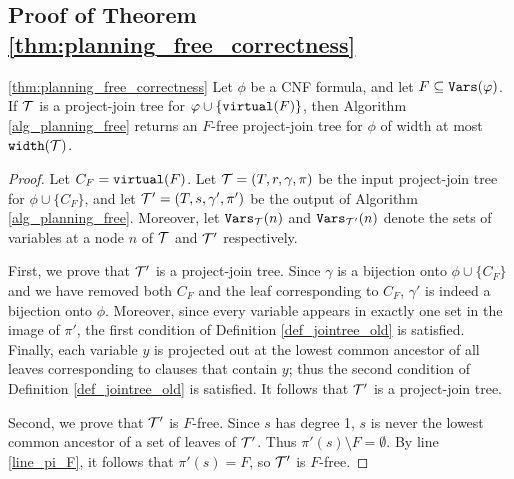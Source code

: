\subsection{Proof of Theorem \ref{thm:planning_free_correctness}}
\begin{theorem}{\ref{thm:planning_free_correctness}}
Let $\phi$ be a CNF formula, and let $F \subseteq \texttt{\upshape Vars}(\varphi)$. 
If $\mathcal{T}$ is a project-join tree for $\varphi \cup \{\texttt{\upshape virtual}(F)\}$, then Algorithm \ref{alg_planning_free} returns an $F$-free project-join tree for $\phi$ of width at most $\texttt{\upshape width}(\mathcal{T})$.
\end{theorem}
\begin{proof}
Let $C_F = \texttt{\upshape virtual}(F)$.
Let $\mathcal{T} = (T, r, \gamma, \pi)$ be the input project-join tree for $\phi \cup \{ C_F \}$, and let $\mathcal{T}' = (T, s, \gamma', \pi')$ be the output of Algorithm \ref{alg_planning_free}. 
Moreover, let $\texttt{\upshape Vars}_{\mathcal{T}}(n)$ and $\texttt{\upshape Vars}_{\mathcal{T}'}(n)$ denote the sets of variables at a node $n$ of $\mathcal{T}$ and $\mathcal{T}'$ respectively.


First, we prove that $\mathcal{T}'$ is a project-join tree. Since $\gamma$ is a bijection onto $\phi \cup \{C_F\}$ and we have removed both $C_F$ and the leaf corresponding to $C_F$, $\gamma'$ is indeed a bijection onto $\phi$. 
Moreover, since every variable appears in exactly one set in the image of $\pi'$, the first condition of Definition \ref{def_jointree_old} is satisfied. Finally, each variable $y$ is projected out at the lowest common ancestor of all leaves corresponding to clauses that contain $y$; thus the second condition of Definition \ref{def_jointree_old} is satisfied. It follows that $\mathcal{T}'$ is a project-join tree.

Second, we prove that $\mathcal{T}'$ is $F$-free. 
Since $s$ has degree 1, $s$ is never the lowest common ancestor of a set of leaves of $\mathcal{T}'$. Thus $\pi'(s) \setminus F = \emptyset$. By line \ref{line_pi_F}, it follows that $\pi'(s) = F$, so $\mathcal{T}'$ is $F$-free.




\end{proof}
